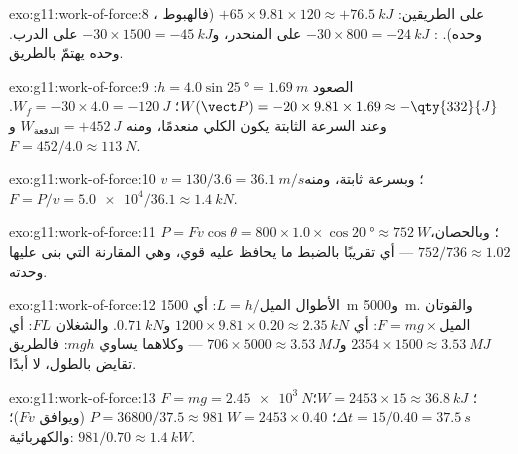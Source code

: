 \begin{solution}{exo:g11:work-of-force:8}
، على الطريقين: $+65 \times 9.81 \times 120 \approx
+\qty{76.5}{kJ}$ (فالهبوط وحده). : $-30 \times 800 =
-\qty{24}{kJ}$ على المنحدر، و$-30 \times 1500 = -\qty{45}{kJ}$ على
الدرب.  وحده يهتمّ بالطريق.
\end{solution}

\begin{solution}{exo:g11:work-of-force:9}
الصعود $h = 4.0\sin\qty{25}{\degree} = \qty{1.69}{m}$:
$W(\vect P) = -20 \times 9.81 \times 1.69 \approx -\qty{332}{J}$؛
$W_f = -30 \times 4.0 = -\qty{120}{J}$. وعند السرعة الثابتة يكون  الكلي
منعدمًا، ومنه $W_{\text{الدفعة}} = +\qty{452}{J}$ و
$F = 452/4.0 \approx \qty{113}{N}$.
\end{solution}

\begin{solution}{exo:g11:work-of-force:10}
$v = 130/3.6 = \qty{36.1}{m/s}$؛ وبسرعة ثابتة، ومنه
$F = P/v = \num{5.0e4}/36.1 \approx \qty{1.4}{kN}$.
\end{solution}

\begin{solution}{exo:g11:work-of-force:11}
$P = Fv\cos\theta = 800 \times 1.0 \times \cos\qty{20}{\degree}
\approx \qty{752}{W}$؛ وبالحصان، $752/736 \approx \num{1.02}$ ---
أي تقريبًا بالضبط ما يحافظ عليه  قوي، وهي المقارنة التي بنى
 عليها وحدته.
\end{solution}

\begin{solution}{exo:g11:work-of-force:12}
الأطوال $L = h/\text{الميل}$: أي \qty{1500}{m} و\qty{5000}{m}. والقوتان
$F = mg \times \text{الميل}$: أي $1200 \times 9.81 \times 0.20 \approx
\qty{2.35}{kN}$ و$\qty{0.71}{kN}$. والشغلان $FL$: أي $2354 \times 1500
\approx \qty{3.53}{MJ}$ و$706 \times 5000 \approx \qty{3.53}{MJ}$
--- وكلاهما يساوي $mgh$: فالطريق تقايض  بالطول، لا  أبدًا.
\end{solution}

\begin{solution}{exo:g11:work-of-force:13}
$F = mg = \qty{2.45e3}{N}$؛ $W = 2453 \times 15 \approx \qty{36.8}{kJ}$؛
$\Delta t = 15/0.40 = \qty{37.5}{s}$؛
$P = 36800/37.5 \approx \qty{981}{W} = 2453 \times 0.40$ (ويوافق $Fv$)؛
والكهربائية: $981/0.70 \approx \qty{1.4}{kW}$.
\end{solution}

